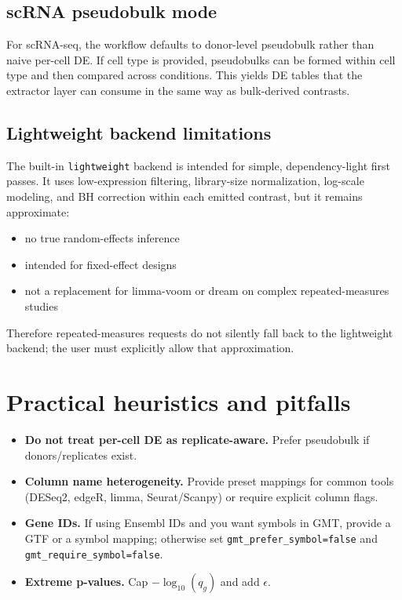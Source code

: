 \documentclass[11pt]{article}
\begin{document}
\subsection*{scRNA pseudobulk mode}
For scRNA-seq, the workflow defaults to donor-level pseudobulk rather than naive per-cell DE.
If cell type is provided, pseudobulks can be formed within cell type and then compared across conditions.
This yields DE tables that the extractor layer can consume in the same way as bulk-derived contrasts.

\subsection*{Lightweight backend limitations}
The built-in \texttt{lightweight} backend is intended for simple, dependency-light first passes.
It uses low-expression filtering, library-size normalization, log-scale modeling, and BH correction within each emitted contrast, but it remains approximate:
\begin{itemize}[leftmargin=2em]
\item no true random-effects inference
\item intended for fixed-effect designs
\item not a replacement for limma-voom or dream on complex repeated-measures studies
\end{itemize}
Therefore repeated-measures requests do not silently fall back to the lightweight backend; the user must explicitly allow that approximation.

\section{Practical heuristics and pitfalls}
\begin{itemize}[leftmargin=2em]
\item \textbf{Do not treat per-cell DE as replicate-aware.} Prefer pseudobulk if donors/replicates exist. \cite{crowell2020muscat}
\item \textbf{Column name heterogeneity.} Provide preset mappings for common tools (DESeq2, edgeR, limma, Seurat/Scanpy) or require explicit column flags.
\item \textbf{Gene IDs.} If using Ensembl IDs and you want symbols in GMT, provide a GTF or a symbol mapping; otherwise set \texttt{gmt\_prefer\_symbol=false} and \texttt{gmt\_require\_symbol=false}.
\item \textbf{Extreme p-values.} Cap $-\log_{10}(q_g)$ and add $\epsilon$.
\end{itemize}
\end{document}
